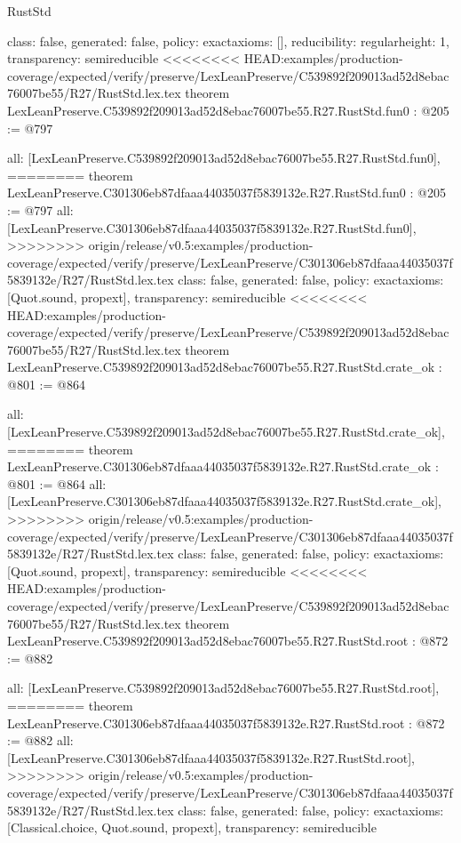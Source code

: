 \begin{lexlean}{RustStd}
\begin{coremodule}
{\begin{coremodule}
{{{  class: false,
  generated: false,
  policy: exact{axioms: []},
  reducibility: regular{height: 1},
  transparency: semireducible
}
<<<<<<<< HEAD:examples/production-coverage/expected/verify/preserve/LexLeanPreserve/C539892f209013ad52d8ebac76007be55/R27/RustStd.lex.tex
theorem LexLeanPreserve.C539892f209013ad52d8ebac76007be55.R27.RustStd.fun0 : @205 := @797 {
  all: [LexLeanPreserve.C539892f209013ad52d8ebac76007be55.R27.RustStd.fun0],
========
theorem LexLeanPreserve.C301306eb87dfaaa44035037f5839132e.R27.RustStd.fun0 : @205 := @797 {
  all: [LexLeanPreserve.C301306eb87dfaaa44035037f5839132e.R27.RustStd.fun0],
>>>>>>>> origin/release/v0.5:examples/production-coverage/expected/verify/preserve/LexLeanPreserve/C301306eb87dfaaa44035037f5839132e/R27/RustStd.lex.tex
  class: false,
  generated: false,
  policy: exact{axioms: [Quot.sound, propext]},
  transparency: semireducible
}
<<<<<<<< HEAD:examples/production-coverage/expected/verify/preserve/LexLeanPreserve/C539892f209013ad52d8ebac76007be55/R27/RustStd.lex.tex
theorem LexLeanPreserve.C539892f209013ad52d8ebac76007be55.R27.RustStd.crate_ok : @801 := @864 {
  all: [LexLeanPreserve.C539892f209013ad52d8ebac76007be55.R27.RustStd.crate_ok],
========
theorem LexLeanPreserve.C301306eb87dfaaa44035037f5839132e.R27.RustStd.crate_ok : @801 := @864 {
  all: [LexLeanPreserve.C301306eb87dfaaa44035037f5839132e.R27.RustStd.crate_ok],
>>>>>>>> origin/release/v0.5:examples/production-coverage/expected/verify/preserve/LexLeanPreserve/C301306eb87dfaaa44035037f5839132e/R27/RustStd.lex.tex
  class: false,
  generated: false,
  policy: exact{axioms: [Quot.sound, propext]},
  transparency: semireducible
}
<<<<<<<< HEAD:examples/production-coverage/expected/verify/preserve/LexLeanPreserve/C539892f209013ad52d8ebac76007be55/R27/RustStd.lex.tex
theorem LexLeanPreserve.C539892f209013ad52d8ebac76007be55.R27.RustStd.root : @872 := @882 {
  all: [LexLeanPreserve.C539892f209013ad52d8ebac76007be55.R27.RustStd.root],
========
theorem LexLeanPreserve.C301306eb87dfaaa44035037f5839132e.R27.RustStd.root : @872 := @882 {
  all: [LexLeanPreserve.C301306eb87dfaaa44035037f5839132e.R27.RustStd.root],
>>>>>>>> origin/release/v0.5:examples/production-coverage/expected/verify/preserve/LexLeanPreserve/C301306eb87dfaaa44035037f5839132e/R27/RustStd.lex.tex
  class: false,
  generated: false,
  policy: exact{axioms: [Classical.choice, Quot.sound, propext]},
  transparency: semireducible
}

}}}}}
\end{coremodule}}
\end{coremodule}
\end{lexlean}
